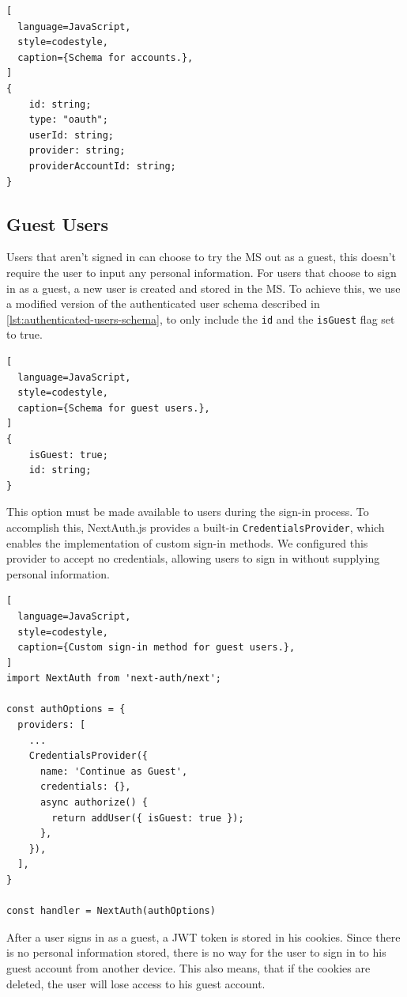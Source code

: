 \begin{lstlisting}[
  language=JavaScript,
  style=codestyle,
  caption={Schema for accounts.},
]
{
    id: string;
    type: "oauth";
    userId: string;
    provider: string;
    providerAccountId: string;
}
\end{lstlisting}

\subsection{Guest Users}

Users that aren't signed in can choose to try the MS out as a guest, this doesn't require
the user to input any personal information.
For users that choose to sign in as a guest, a new user is created and stored in the MS.
To achieve this, we use a modified version of the authenticated user schema described in
\ref{lst:authenticated-users-schema}, to only include the \lstinline{id} and the
\lstinline{isGuest} flag set to true.

\begin{lstlisting}[
  language=JavaScript,
  style=codestyle,
  caption={Schema for guest users.},
]
{
    isGuest: true;
    id: string;
} 
\end{lstlisting}

This option must be made available to users during the sign-in process. 
To accomplish this, NextAuth.js provides a built-in \lstinline{CredentialsProvider}, 
which enables the implementation of custom sign-in methods. 
We configured this provider to accept no credentials,
allowing users to sign in without supplying personal information.

\begin{lstlisting}[
  language=JavaScript,
  style=codestyle,
  caption={Custom sign-in method for guest users.},
]
import NextAuth from 'next-auth/next';

const authOptions = {
  providers: [
    ...
    CredentialsProvider({
      name: 'Continue as Guest',
      credentials: {},
      async authorize() {
        return addUser({ isGuest: true });
      },
    }),
  ],
}

const handler = NextAuth(authOptions)
\end{lstlisting}

After a user signs in as a guest, a JWT token is stored in his cookies.
Since there is no personal information stored, there is no way for the user to sign in to
his guest account from another device.
This also means, that if the cookies are deleted, the user will lose access to his guest account.

